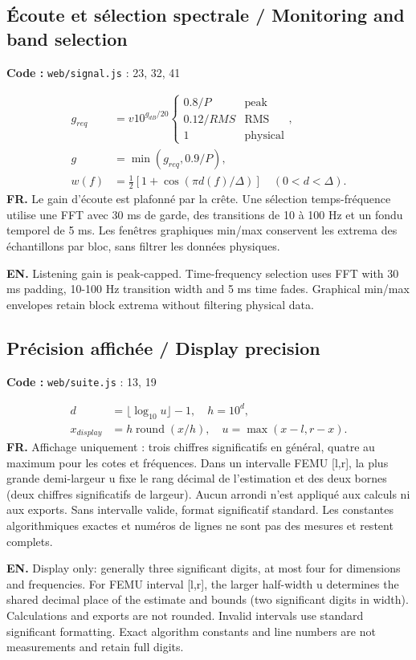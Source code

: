 \documentclass[10pt,a4paper]{article}
\newcommand{\FR}[1]{\textbf{FR.} #1\par}\newcommand{\EN}[1]{{\selectlanguage{english}\textbf{EN.} #1\par}}
\newcommand{\loc}[1]{{\small\color{ink}\textbf{Code :} #1\par}}
\begin{document}
\begin{samepage}\subsection{Écoute et sélection spectrale / Monitoring and band selection}
\loc{\texttt{web/signal.js} : 23, 32, 41}
\begin{align}g_{req}&=v10^{g_{dB}/20}\begin{cases}0.8/P&\text{peak}\\0.12/RMS&\text{RMS}\\1&\text{physical}\end{cases},\\
g&=\min(g_{req},0.9/P),\\
w(f)&=\tfrac12[1+\cos(\pi d(f)/\Delta)]\quad(0<d<\Delta).\end{align}
\FR{Le gain d’écoute est plafonné par la crête. Une sélection temps-fréquence utilise une FFT avec 30 ms de garde, des transitions de 10 à 100 Hz et un fondu temporel de 5 ms. Les fenêtres graphiques min/max conservent les extrema des échantillons par bloc, sans filtrer les données physiques.}
\EN{Listening gain is peak-capped. Time-frequency selection uses FFT with 30 ms padding, 10-100 Hz transition width and 5 ms time fades. Graphical min/max envelopes retain block extrema without filtering physical data.}
\end{samepage}
\begin{samepage}\subsection{Précision affichée / Display precision}
\loc{\texttt{web/suite.js} : 13, 19}
\begin{align}d&=\lfloor\log_{10}u\rfloor-1,\quad h=10^d,\\x_{display}&=h\operatorname{round}(x/h),\quad u=\max(x-l,r-x).\end{align}
\FR{Affichage uniquement : trois chiffres significatifs en général, quatre au maximum pour les cotes et fréquences. Dans un intervalle FEMU [l,r], la plus grande demi-largeur u fixe le rang décimal de l’estimation et des deux bornes (deux chiffres significatifs de largeur). Aucun arrondi n’est appliqué aux calculs ni aux exports. Sans intervalle valide, format significatif standard. Les constantes algorithmiques exactes et numéros de lignes ne sont pas des mesures et restent complets.}
\EN{Display only: generally three significant digits, at most four for dimensions and frequencies. For FEMU interval [l,r], the larger half-width u determines the shared decimal place of the estimate and bounds (two significant digits in width). Calculations and exports are not rounded. Invalid intervals use standard significant formatting. Exact algorithm constants and line numbers are not measurements and retain full digits.}
\end{samepage}
\end{document}
